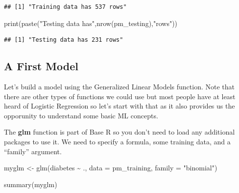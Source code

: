 \documentclass[
]{article}
\newenvironment{Shaded}{\begin{snugshade}}{\end{snugshade}}
\newcommand{\AttributeTok}[1]{\textcolor[rgb]{0.77,0.63,0.00}{#1}}
\newcommand{\FunctionTok}[1]{\textcolor[rgb]{0.00,0.00,0.00}{#1}}
\newcommand{\NormalTok}[1]{#1}
\newcommand{\OtherTok}[1]{\textcolor[rgb]{0.56,0.35,0.01}{#1}}
\newcommand{\SpecialCharTok}[1]{\textcolor[rgb]{0.00,0.00,0.00}{#1}}
\newcommand{\StringTok}[1]{\textcolor[rgb]{0.31,0.60,0.02}{#1}}
\begin{document}
\begin{Shaded}
\end{Shaded}

\begin{verbatim}
## [1] "Training data has 537 rows"
\end{verbatim}

\begin{Shaded}
\begin{Highlighting}[]
\FunctionTok{print}\NormalTok{(}\FunctionTok{paste}\NormalTok{(}\StringTok{"Testing data has"}\NormalTok{,}\FunctionTok{nrow}\NormalTok{(pm\_testing),}\StringTok{"rows"}\NormalTok{))}
\end{Highlighting}
\end{Shaded}

\begin{verbatim}
## [1] "Testing data has 231 rows"
\end{verbatim}

\hypertarget{a-first-model}{%
\subsection{A First Model}\label{a-first-model}}

Let's build a model using the Generalized Linear Models function. Note
that there are other types of functions we could use but most people
have at least heard of Logistic Regression so let's start with that as
it also provides us the opporunity to understand some basic ML concepts.

The \textbf{glm} function is part of Base R so you don't need to load
any additional packages to use it. We need to specify a formula, some
training data, and a ``family'' argument.

\begin{Shaded}
\begin{Highlighting}[]
\NormalTok{myglm }\OtherTok{\textless{}{-}} \FunctionTok{glm}\NormalTok{(diabetes }\SpecialCharTok{\textasciitilde{}}\NormalTok{ .,}
             \AttributeTok{data =}\NormalTok{ pm\_training,}
             \AttributeTok{family =} \StringTok{"binomial"}\NormalTok{)}

\FunctionTok{summary}\NormalTok{(myglm)}
\end{Highlighting}
\end{Shaded}
\end{document}
